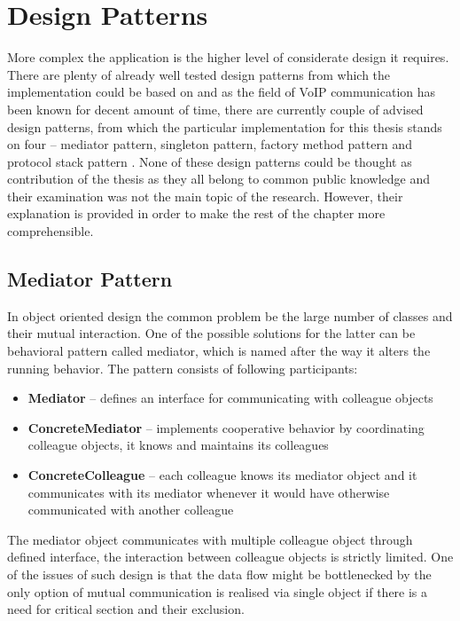 \section{Design Patterns}
More complex the application is the higher level of considerate design it 
requires. There are plenty of already well tested design patterns from
which the implementation could be based on and as the field of VoIP
communication has been known for decent amount of time, there are currently
couple of advised design patterns, from which the particular implementation for 
this thesis stands on four -- mediator pattern, singleton pattern, factory 
method pattern \cite{design-patterns} and protocol stack pattern 
\cite{protocol-stack}. None of these design patterns could be thought as 
contribution of the thesis as they all belong to common public knowledge and 
their examination was not the main topic of the  research. However, their 
explanation is provided in order to make the rest of the chapter more 
comprehensible.

\subsection{Mediator Pattern}
In object oriented design the common problem be the large number of classes and
their mutual interaction. One of the possible solutions for the latter can be
behavioral pattern called mediator, which is named after the way it alters the
running behavior. The pattern consists of following participants:

\begin{itemize}
\item \textbf{Mediator} -- defines an interface for communicating with colleague 
objects
\item \textbf{ConcreteMediator} -- implements cooperative behavior by 
coordinating colleague objects, it knows and maintains its colleagues
\item \textbf{ConcreteColleague} -- each colleague knows its mediator object and
it communicates with its mediator whenever it would have otherwise communicated 
with another colleague
\end{itemize}

The mediator object communicates with multiple colleague object through defined
interface, the interaction between colleague objects is strictly limited.
One of the issues of such design is that the data flow might be bottlenecked by
the only option of mutual communication is realised via single object if there
is a need for critical section and their exclusion.

